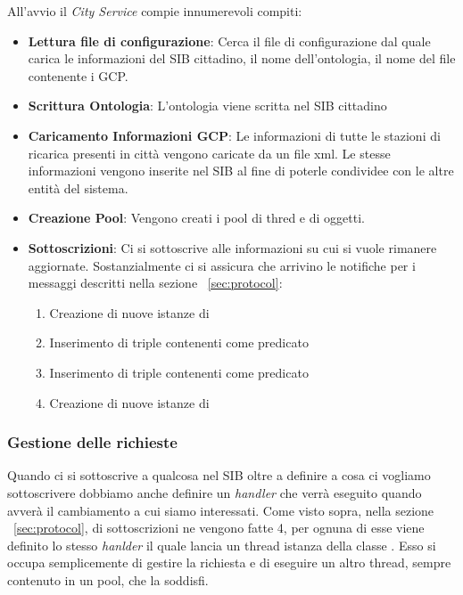 All'avvio il \emph{City Service} compie innumerevoli compiti:

\begin{itemize}
	\item \textbf{Lettura file di configurazione}: Cerca il file di configurazione  dal quale carica le informazioni del SIB cittadino, il nome dell'ontologia, il nome del file contenente i GCP.
	\item \textbf{Scrittura Ontologia}: L'ontologia viene scritta nel SIB cittadino
	\item \textbf{Caricamento Informazioni GCP}: Le informazioni di tutte le stazioni di ricarica presenti in città vengono caricate da un file xml. Le stesse informazioni vengono inserite nel SIB al fine di poterle condividee con le altre entità del sistema.
	\item \textbf{Creazione Pool}: Vengono creati i pool di thred e di oggetti.
	\item \label{item:subscr} \textbf{Sottoscrizioni}: Ci si sottoscrive alle informazioni su cui si vuole rimanere aggiornate. Sostanzialmente ci si assicura che arrivino le notifiche per i messaggi descritti nella sezione ~\ref{sec:protocol}:
	\begin{enumerate}
		\item Creazione di nuove istanze di 
		\item Inserimento di triple contenenti come predicato 
		\item Inserimento di triple contenenti come predicato 
		\item Creazione di nuove istanze di 
	\end{enumerate}
\end{itemize}

\subsubsection{Gestione delle richieste}

Quando ci si sottoscrive a qualcosa nel SIB oltre a definire a cosa ci vogliamo sottoscrivere dobbiamo anche definire un \emph{handler} che verrà eseguito quando avverà il cambiamento a cui siamo interessati. Come visto sopra, nella sezione ~\ref{sec:protocol}, di sottoscrizioni ne vengono fatte 4, per ognuna di esse viene definito lo stesso \emph{hanlder} il quale lancia un thread istanza della classe . Esso si occupa semplicemente di gestire la richiesta e di eseguire un altro thread, sempre contenuto in un pool, che la soddisfi.

